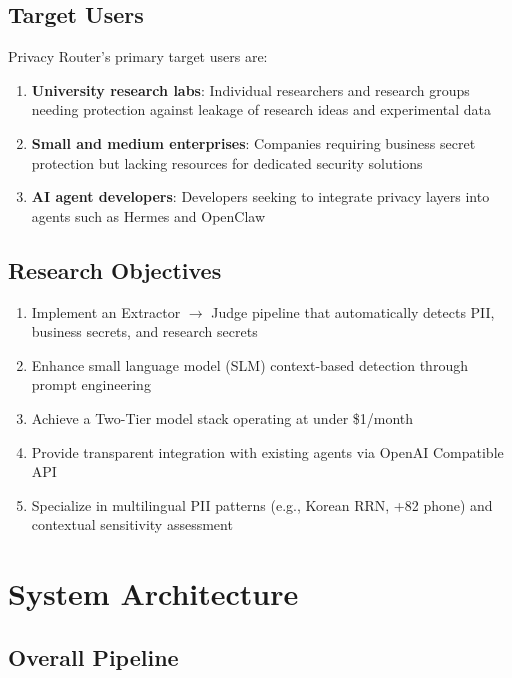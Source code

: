 \documentclass[11pt,a4paper]{article}
\begin{document}
\subsection{Target Users}

Privacy Router's primary target users are:

\begin{enumerate}[nosep]
  \item \textbf{University research labs}: Individual researchers and research groups needing protection against leakage of research ideas and experimental data
  \item \textbf{Small and medium enterprises}: Companies requiring business secret protection but lacking resources for dedicated security solutions
  \item \textbf{AI agent developers}: Developers seeking to integrate privacy layers into agents such as Hermes and OpenClaw
\end{enumerate}

\subsection{Research Objectives}

\begin{enumerate}[nosep]
  \item Implement an Extractor $\rightarrow$ Judge pipeline that automatically detects PII, business secrets, and research secrets
  \item Enhance small language model (SLM) context-based detection through prompt engineering
  \item Achieve a Two-Tier model stack operating at under \$1/month
  \item Provide transparent integration with existing agents via OpenAI Compatible API
  \item Specialize in multilingual PII patterns (e.g., Korean RRN, +82 phone) and contextual sensitivity assessment
\end{enumerate}

\section{System Architecture}

\subsection{Overall Pipeline}
\end{document}
